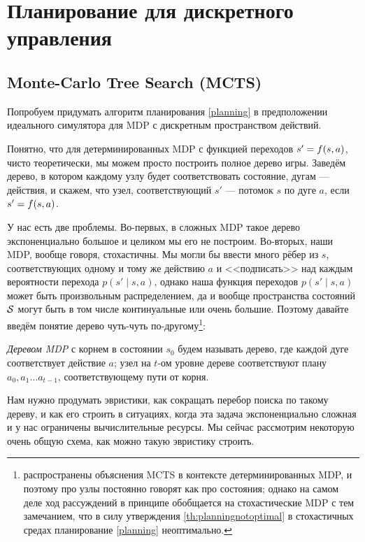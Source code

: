 \section{Планирование для дискретного управления}\label{mctssection}

\subsection{Monte-Carlo Tree Search (MCTS)}

Попробуем придумать алгоритм планирования \eqref{planning} в предположении идеального симулятора для MDP с дискретным пространством действий.

Понятно, что для детерминированных MDP с функцией переходов $s' \HM= f(s, a)$, чисто теоретически, мы можем просто построить полное дерево игры. Заведём дерево, в котором каждому узлу будет соответствовать состояние, дугам --- действия, и скажем, что узел, соответствующий $s'$ --- потомок $s$ по дуге $a$, если $s' \HM= f(s, a)$.

У нас есть две проблемы. Во-первых, в сложных MDP такое дерево экспоненциально большое и целиком мы его не построим. Во-вторых, наши MDP, вообще говоря, стохастичны. Мы могли бы ввести много рёбер из $s$, соответствующих одному и тому же действию $a$ и <<подписать>> над каждым вероятности перехода $p(s' \mid s, a)$, однако наша функция переходов $p(s' \mid s, a)$ может быть произвольным распределением, да и вообще пространства состояний $\mathcal{S}$ могут быть в том числе континуальные или очень большие. Поэтому давайте введём понятие дерево чуть-чуть по-другому\footnote{распространены объяснения MCTS в контексте детерминированных MDP, и поэтому про узлы постоянно говорят как про состояния; однако на самом деле ход рассуждений в принципе обобщается на стохастические MDP с тем замечанием, что в силу утверждения \ref{th:planningnotoptimal} в стохастичных средах планирование \eqref{planning} неоптимально.}:

\begin{definition}
\emph{Деревом MDP} с корнем в состоянии $s_0$ будем называть дерево, где каждой дуге соответствует действие $a$; узел на $t$-ом уровне дереве соответствуют плану $a_0, a_1 \dots a_{t-1}$, соответствующему пути от корня.
\end{definition}

Нам нужно продумать эвристики, как сокращать перебор поиска по такому дереву, и как его строить в ситуациях, когда эта задача экспоненциально сложная и у нас ограничены вычислительные ресурсы. Мы сейчас рассмотрим некоторую очень общую схема, как можно такую эвристику строить.

